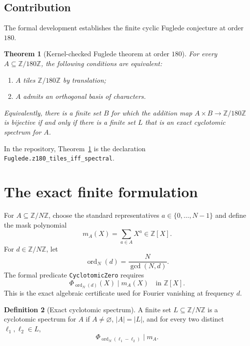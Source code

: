 \documentclass[10pt,twocolumn]{article}
\newtheorem{theorem}{Theorem}
\theoremstyle{definition}
\newtheorem{definition}[theorem]{Definition}
\theoremstyle{remark}
\newcommand{\Z}{\mathbb Z}
\newcommand{\Zmod}[1]{\Z/#1\Z}
\newcommand{\mask}{m_A}
\begin{document}
\subsection*{Contribution}

The formal development establishes the finite cyclic Fuglede conjecture at
order $180$.

\begin{theorem}[Kernel-checked Fuglede theorem at order $180$]\label{thm:main}
For every $A\subseteq\Zmod{180}$, the following conditions are equivalent:
\begin{enumerate}[label=\textup{(\roman*)}]
  \item $A$ tiles $\Zmod{180}$ by translation;
  \item $A$ admits an orthogonal basis of characters.
\end{enumerate}
Equivalently, there is a finite set $B$ for which the addition map
$A\times B\to\Zmod{180}$ is bijective if and only if there is a finite set
$L$ that is an exact cyclotomic spectrum for $A$.
\end{theorem}

In the repository, Theorem~\ref{thm:main} is the declaration
\texttt{Fuglede.z180\_tiles\_iff\_spectral}.

\section{The exact finite formulation}

For $A\subseteq\Zmod{N}$, choose the standard representatives
$a\in\{0,\ldots,N-1\}$ and define the mask polynomial
\[
  \mask(X)=\sum_{a\in A}X^a\in\Z[X].
\]
For $d\in\Zmod N$, let
\[
  \operatorname{ord}_N(d)=\frac{N}{\gcd(N,d)}.
\]
The formal predicate \texttt{CyclotomicZero} requires
\[
  \Phi_{\operatorname{ord}_N(d)}(X)\mid \mask(X)
  \quad\text{in }\Z[X].
\]
This is the exact algebraic certificate used for Fourier vanishing at
frequency $d$.

\begin{definition}[Exact cyclotomic spectrum]
A finite set $L\subseteq\Zmod N$ is a cyclotomic spectrum for $A$ if
$A\ne\varnothing$, $|A|=|L|$, and for every two distinct
$\ell_1,\ell_2\in L$,
\[
  \Phi_{\operatorname{ord}_N(\ell_1-\ell_2)}\mid \mask.
\]
\end{definition}
\end{document}
